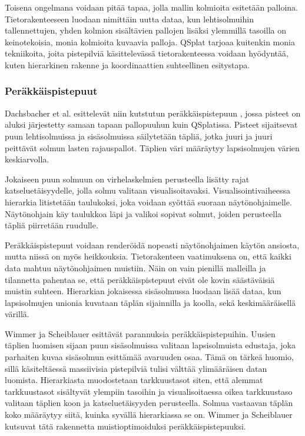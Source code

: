 Toisena ongelmana voidaan pitää tapaa, jolla mallin kolmioita esitetään palloina. Tietorakenteeseen luodaan nimittäin uutta dataa, kun lehtisolmuihin tallennettujen, yhden kolmion sisältävien pallojen lisäksi ylemmillä tasoilla on keinotekoisia, monia kolmioita kuvaavia palloja. QSplat tarjoaa kuitenkin monia tekniikoita, joita pistepilviä käsittelevässä tietorakenteessa voidaan hyödyntää, kuten hierarkinen rakenne ja koordinaattien suhteellinen esitystapa.

\subsubsection{Peräkkäispistepuut}
Dachsbacher et al. esittelevät niin kutstutun peräkkäispistepuun , jossa pisteet on aluksi järjestetty samaan tapaan pallopuuhun kuin QSplatissa. Pisteet sijaitsevat puun lehtisolmuissa ja sisäsolmuissa säilytetään täpliä, jotka juuri ja juuri peittävät solmun lasten rajauspallot. Täplien väri määräytyy lapsisolmujen värien keskiarvolla. \cite{spt}

Jokaiseen puun solmuun on virhelaskelmien perusteella lisätty rajat katseluetäisyydelle, jolla solmu valitaan visualisoitavaksi. Visualisointivaiheessa hierarkia litistetään taulukoksi, joka voidaan syöttää suoraan näytönohjaimelle. Näytönohjain käy taulukkoa läpi ja valikoi sopivat solmut, joiden perusteella täpliä piirretään ruudulle. \cite{spt}

Peräkkäispistepuut voidaan renderöidä nopeasti näytönohjaimen käytön ansiosta, mutta niissä on myös heikkouksia. Tietorakenteen vaatimuksena on, että kaikki data mahtuu näytönohjaimen muistiin. Näin on vain pienillä malleilla ja tilannetta pahentaa se, että peräkkäispistepuut eivät ole kovin säästäväisiä muistin suhteen. Hierarkian jokaisessa sisäsolmussa luodaan lisää dataa, kun lapsisolmujen unionia kuvataan täplän sijainnilla ja koolla, sekä keskimääräisellä värillä.

Wimmer ja Scheiblauer esittävät parannuksia peräkkäispistepuihin. Uusien täplien luomisen sijaan puun sisäsolmuissa valitaan lapsisolmuista edustaja, joka parhaiten kuvaa sisäsolmun esittämää avaruuden osaa. Tämä on tärkeä huomio, sillä käsiteltäessä massiivisia pistepilviä tulisi välttää ylimääräisen datan luomista. Hierarkiasta muodostetaan tarkkuustasot siten, että alemmat tarkkuustasot sisältyvät ylempiin tasoihin ja visualisoitaessa oikea tarkkuustaso valitaan täplien koon ja katseluetäisyyden perusteella. Solmua vastaavan täplän koko määräytyy siitä, kuinka syvällä hierarkiassa se on. Wimmer ja Scheiblauer kutsuvat tätä rakennetta muistioptimoiduksi peräkkäispistepuuksi.  \cite{ip} %

